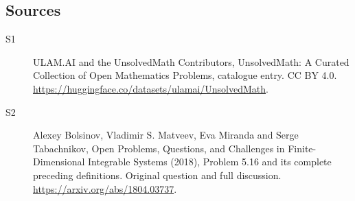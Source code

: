 \documentclass[11pt]{article}
\begin{document}
\subsection{Sources}
\begin{description}
\item[\hypertarget{source:statement:1}{S1}] ULAM.AI and the UnsolvedMath Contributors, UnsolvedMath: A Curated Collection of Open Mathematics Problems, catalogue entry. CC BY 4.0. \url{https://huggingface.co/datasets/ulamai/UnsolvedMath}.
\item[\hypertarget{source:statement:2}{S2}] Alexey Bolsinov, Vladimir S. Matveev, Eva Miranda and Serge Tabachnikov, Open Problems, Questions, and Challenges in Finite-Dimensional Integrable Systems (2018), Problem 5.16 and its complete preceding definitions. Original question and full discussion. \url{https://arxiv.org/abs/1804.03737}.

\end{description}
\label{end:statement}
\end{document}
